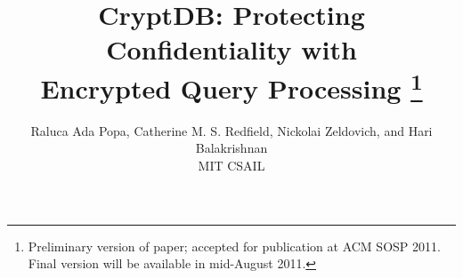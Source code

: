 \documentclass[9pt,twocolumn]{article}
\begin{document}
\title{\bf CryptDB: Protecting Confidentiality with \\
	   Encrypted Query Processing%
    \thanks{Preliminary version of paper; accepted for publication at ACM SOSP 2011.
	    Final version will be available in mid-August 2011.}}
\author{Raluca Ada Popa, Catherine M. S. Redfield,
	Nickolai Zeldovich, and Hari Balakrishnan \\
	MIT CSAIL}
\date{}

\newcommand{\RND}{\textrm{RND}}
\newcommand{\DET}{\textrm{DET}}
\newcommand{\OPE}{\textrm{OPE}}
\newcommand{\OPEJOIN}{\textrm{OPE-JOIN}}
\newcommand{\HOM}{\textrm{HOM}}
\newcommand{\JOIN}{\textrm{JOIN}}
\newcommand{\SEARCH}{\textrm{SEARCH}}

\newcommand{\up}{\texttt{UPDATE}}
\newcommand{\ins}{\texttt{INSERT}}
\newcommand{\del}{\texttt{DELETE}}
\newcommand{\sel}{\texttt{SELECT}}

\newcommand{\rap}[1]{\textcolor{blue}{RAP: #1}}
\newcommand{\hb}[1]{\textcolor{red}{HB: #1}}
\newcommand{\nz}[1]{\textcolor{magenta}{NZ: #1}}
\newcommand{\cmsr}[1]{\textcolor{green}{CR: #1}}
\newcommand{\todo}[1]{\textcolor{red}{#1}}


\newcommand{\tput}{27\%}

\newtheorem{definition}{Definition}
\newtheorem{theorem}{Theorem}

\maketitle







 





{
\small
\setlength{\bibsep}{3pt}


}
\end{document}
